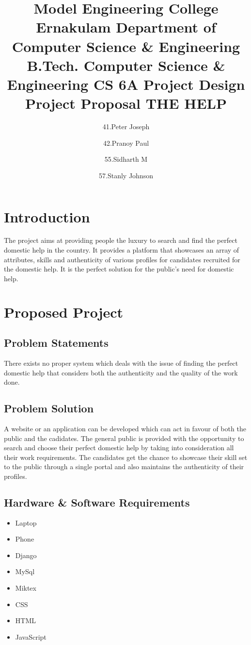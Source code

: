 \documentclass[a4paper]{article}
\title{Model Engineering College Ernakulam \linebreak 
Department of Computer Science \& Engineering \linebreak
B.Tech. Computer Science \& Engineering \linebreak
CS 6A Project Design \linebreak
Project Proposal \linebreak
THE HELP}
\author{41.Peter Joseph \and 42.Pranoy Paul \and 55.Sidharth M \and 57.Stanly Johnson}
\begin{document}
\maketitle



\section{Introduction}

The project aims at providing people the luxury to search and find the perfect domestic help in the country.
It provides a platform that showcases an array of attributes, skills and authenticity of various profiles for candidates recruited for the domestic help.
It is the perfect solution for the public's need for domestic help. 

\section{Proposed Project}



\subsection{Problem Statements}

There exists no proper system which deals with the issue of finding the perfect domestic help that considers both the authenticity and the quality of the work done.

\subsection{Problem Solution}

A website or an application can be developed which can act in favour of both the public and the cadidates. 
The general public is provided with the opportunity to search and choose their perfect domestic help by taking into consideration all their work requirements. 
The candidates get the chance to showcase their skill set to the public through a single portal and also maintains the authenticity of their profiles. 


\subsection{Hardware \& Software Requirements}

\begin{itemize}
\item Laptop
\item Phone
\item Django
\item MySql
\item Miktex
\item CSS
\item HTML
\item JavaScript
\end{itemize}
\end{document}

